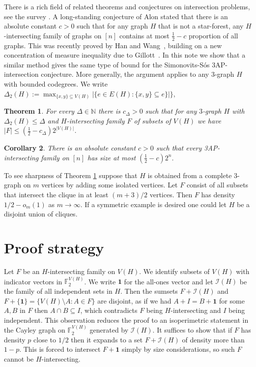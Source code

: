 \documentclass[10pt,a4paper]{amsart}
\newtheorem{theorem}{Theorem}[section]
\newtheorem{corollary}[theorem]{Corollary}
\newcommand{\I}{\mathcal I}
\newcommand{\1}{\mathbf 1}
\begin{document}
There is a rich field of related theorems and conjectures on intersection problems, see the survey \cite{E2022}. 
A long-standing conjecture of Alon stated that there is an absolute constant $c>0$ such that 
for any graph $H$ that is not a star-forest, any $H$-intersecting family of graphs on $[n]$
contains at most $\tfrac12 - c$ proportion of all graphs. This was recently proved by Han and Wang~\cite{HanWang2026},
building on a new concentration of measure inequality due to Gillott~\cite{Gillott2026}.
In this note we show that a similar method gives the same type of bound
for the Simonovits-S\'os 3AP-intersection conjecture. More generally,
the argument applies to any $3$-graph $H$ with bounded codegrees.
We write $\Delta_2(H) := \max_{\{x,y\}\subseteq V(H)}  |\{e\in E(H):\{x,y\}\subseteq e\}|\}$,


\begin{theorem}\label{thm:main}
For every $\Delta \in \mathbb{N}$ there is $c_\Delta>0$
such that for any $3$-graph $H$ with $\Delta_2(H)\le\Delta$
and $H$-intersecting family $F$ of subsets of $V(H)$
we have $|F| \le (\tfrac12 - c_\Delta)2^{|V(H)|}$.
\end{theorem}


\begin{corollary}\label{cor:3ap}
There is an absolute constant \(c>0\) such that every
3AP-intersecting family on $[n]$ has size at most $(\tfrac12 - c)2^n$. 
\end{corollary}

To see sharpness of Theorem \ref{thm:main} suppose that $H$ is obtained from a complete $3$-graph on $m$ vertices by adding some isolated vertices.
Let $F$ consist of all subsets that intersect the clique in at least $(m+3)/2$ vertices.
Then $F$ has density $1/2 - o_m(1)$ as $m \to \infty$. If a symmetric example is desired
one could let $H$ be a disjoint union of cliques.

\section{Proof strategy}

Let $F$ be an $H$-intersecting family on $V(H)$.
We identify subsets of $V(H)$ with indicator vectors in $\mathbb{F}_2^{V(H)}$.
We write \(\1\) for the all-ones vector and
let $\I(H)$ be the family of all independent sets in $H$.
Then the sumsets $F+\I(H)$ and $F+\{\1\} = \{ V(H) \setminus A: A \in F\}$ are disjoint,
as if we had $A+I=B+\1$ for some $A,B$ in $F$ then $A \cap B \subseteq I$,
which contradicts $F$ being $H$-intersecting and $I$ being independent.
This observation reduces the proof to an isoperimetric statement 
in the Cayley graph on $\mathbb{F}_2^{V(H)}$ generated by $\I(H)$.
It suffices to show that if $F$ has density $p$ close to $1/2$ then it expands
to a set $F+\I(H)$ of density more than $1-p$. This is forced to intersect $F+\1$
simply by size considerations, so such $F$ cannot be $H$-intersecting.
\end{document}
